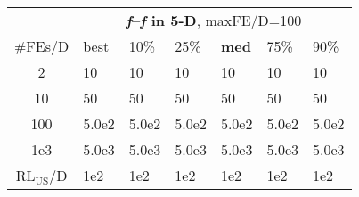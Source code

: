 \begin{tabular}{c|llllll}
 & \multicolumn{6}{|c}{\textbf{\textit{f}\raisebox{-0.35ex}{1}--\textit{f}\raisebox{-0.35ex}{1} in 5-D}, maxFE/D=100}\\
\#FEs/D & best & 10\% & 25\% & \textbf{med} & 75\% & 90\%\\
2 & 10 & 10 & 10 & 10 & 10 & 10\\
10 & 50 & 50 & 50 & 50 & 50 & 50\\
100 & 5.0e2 & 5.0e2 & 5.0e2 & 5.0e2 & 5.0e2 & 5.0e2\\
1e3 & 5.0e3 & 5.0e3 & 5.0e3 & 5.0e3 & 5.0e3 & 5.0e3\\
$\text{RL}_{\text{US}}$/D & 1e2 & 1e2 & 1e2 & 1e2 & 1e2 & 1e2
\end{tabular}
